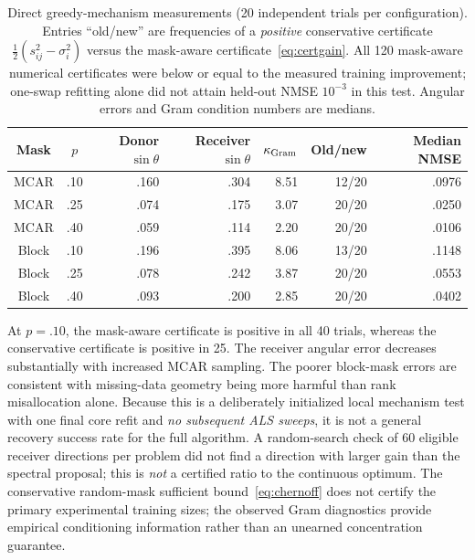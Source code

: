\documentclass[review,10pt]{elsarticle}
\begin{document}
\begin{table}[tbp]
\caption{Direct greedy-mechanism measurements (20 independent trials per configuration). Entries ``old/new'' are frequencies of a \emph{positive} conservative certificate $\frac12(s_{ij}^2-\sigma_i^2)$ versus the mask-aware certificate~\eqref{eq:certgain}. All 120 mask-aware numerical certificates were below or equal to the measured training improvement; one-swap refitting alone did not attain held-out NMSE $10^{-3}$ in this test. Angular errors and Gram condition numbers are medians.}\label{tab:mechanism}
\centering\footnotesize
\begin{tabular}{ccrrrrr}
\toprule
Mask & $p$ & Donor $\sin\theta$ & Receiver $\sin\theta$ & $\kappa_{\rm Gram}$ & Old/new & Median NMSE\\
\midrule
MCAR & .10 & .160 & .304 & 8.51 & 12/20 & .0976\\
MCAR & .25 & .074 & .175 & 3.07 & 20/20 & .0250\\
MCAR & .40 & .059 & .114 & 2.20 & 20/20 & .0106\\
Block & .10 & .196 & .395 & 8.06 & 13/20 & .1148\\
Block & .25 & .078 & .242 & 3.87 & 20/20 & .0553\\
Block & .40 & .093 & .200 & 2.85 & 20/20 & .0402\\
\bottomrule
\end{tabular}
\end{table}

At $p=.10$, the mask-aware certificate is positive in all 40 trials, whereas the conservative certificate is positive in 25. The receiver angular error decreases substantially with increased MCAR sampling. The poorer block-mask errors are consistent with missing-data geometry being more harmful than rank misallocation alone. Because this is a deliberately initialized local mechanism test with one final core refit and \emph{no subsequent ALS sweeps}, it is not a general recovery success rate for the full algorithm. A random-search check of 60 eligible receiver directions per problem did not find a direction with larger gain than the spectral proposal; this is \emph{not} a certified ratio to the continuous optimum. The conservative random-mask sufficient bound~\eqref{eq:chernoff} does not certify the primary experimental training sizes; the observed Gram diagnostics provide empirical conditioning information rather than an unearned concentration guarantee.
\end{document}
